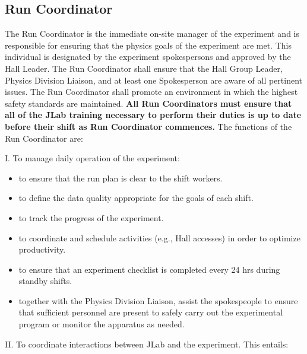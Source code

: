 \documentclass[10pt]{article}
\begin{document}
\subsection{Run Coordinator}

 The Run Coordinator is the  immediate on-site manager of the experiment
and is responsible for ensuring that the physics goals of the experiment
are met. This individual is designated by the experiment spokespersons
and approved by the Hall Leader.  The Run Coordinator shall ensure that
the Hall Group Leader, Physics Division Liaison, and at least
one Spokesperson are aware of all pertinent issues. The Run Coordinator
shall promote an environment in which the highest safety
standards are maintained.
{\bf All Run Coordinators must ensure that all of the JLab training necessary to perform
their duties is up to date before their shift as Run Coordinator commences.}
The functions of the Run Coordinator  are:

\noindent I. To manage daily operation of the experiment:

\begin{itemize}

\item to ensure that the run plan is clear to the shift workers.

\item to define the data quality appropriate for the goals of each shift.

\item to track the progress of the experiment.

\item to coordinate and schedule activities (e.g.,
Hall accesses) in order to optimize productivity.

\item to ensure that an experiment checklist is completed every 24 hrs during
standby shifts.

\item together with the Physics Division Liaison,
assist the spokespeople to ensure that
sufficient personnel are present to safely carry out the experimental
program or monitor the apparatus as needed.

\end{itemize}


\vspace{.25cm}

\noindent II. To coordinate interactions between JLab and the experiment. This
 entails:
\end{document}
